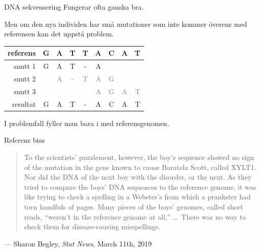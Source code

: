 \documentclass[11pt, aspectratio=169, table]{beamer}
\begin{document}
\begin{frame}{DNA sekvensering}
\setlength{\parskip}{\fill}
Fungerar ofta ganska bra.

Men om den nya individen har små mutationer som inte kommer överens med referensen kan det uppstå problem.

\begin{center}
\tt \begin{tabular}{r|cccccccc}
\sf referens & G & A & T & T & A & C & A & T\\
\hline
\sf snutt 1    & G & A & T & - & A\\
\sf snutt 2    &   & \textcolor{gray}{A} & \textcolor{gray}{-} & \textcolor{gray}{T} & \textcolor{gray}{A} & \textcolor{gray}{G}\\
\sf snutt 3    &   &   &   &   & \textcolor{gray}{A} & \textcolor{gray}{G} & \textcolor{gray}{A} & \textcolor{gray}{T}\\
\hline
\sf resultat    & G & A & T & - & A & C & A & T
\end{tabular}
\end{center}

I problemfall fyller man bara i med referensgenomen.
\end{frame}

\begin{frame}{Referens bias}
\small
\begin{quotation}
To the scientists' puzzlement, however, the boy's sequence showed no sign of the mutation in the gene known to 
cause Baratela Scott, called XYLT1. Nor did the DNA of the next boy with the disorder, or the next. As they 
tried to compare the boys' DNA sequences to the reference genome, it was like trying to check a spelling in a 
Webster's from which a prankster had torn handfuls of pages. Many pieces of the boys’ genomes, called short reads,
``weren’t in the reference genome at all,'' \dots\ There was no way to check them for disease-causing misspellings.
\end{quotation}

\hfill --- Sharon Begley, {\it Stat News}, March 11th, 2019
\end{frame}
\end{document}

